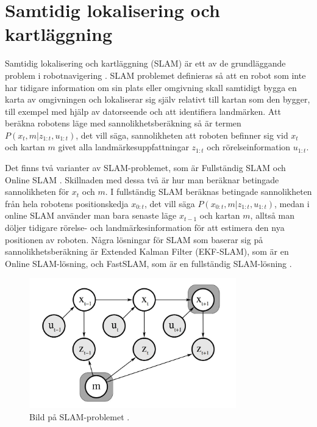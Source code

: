 \chapter{Samtidig lokalisering och kartläggning}

Samtidig lokalisering och kartläggning (SLAM) är ett av de grundläggande problem i robotnavigering \citep{realslamproblem}. SLAM problemet definieras så att en robot som inte har tidigare information om sin plats eller omgivning skall samtidigt bygga en karta av omgivningen och lokaliserar sig själv relativt till kartan som den bygger, till exempel med hjälp av datorseende och att identifiera landmärken. Att beräkna robotens läge med sannolikhetsberäkning så är termen $P(x_t, m|z_{1:t}, u_{1:t})$, det vill säga, sannolikheten att roboten befinner sig vid $x_t$ och kartan $m$ givet alla landmärkesuppfattningar $z_{1:t}$ och rörelseinformation $u_{1:t}$. 

Det finns två varianter av SLAM-problemet, som är Fullständig SLAM och Online SLAM \citep{ProbabilisticRobotics}. Skillnaden med dessa två är hur man beräknar betingade sannolikheten för $x_t$ och $m$. I fullständig SLAM beräknas betingade sannolikheten från hela robotens positionskedja $x_{0:t}$, det vill säga $P(x_{0:t}, m | z_{1:t}, u_{1:t})$, medan i online SLAM använder man bara senaste läge $x_{t-1}$ och kartan $m$, alltså man döljer tidigare rörelse- och landmärkesinformation för att estimera den nya positionen av roboten. Några lösningar för SLAM som baserar sig på sannolikhetsberäkning är Extended Kalman Filter (EKF-SLAM), som är en Online SLAM-lösning, och FastSLAM, som är en fullständig SLAM-lösning \citep{realslamproblem, ProbabilisticRobotics}. 

\begin{figure}[ht]
    \begin{center}
    \includegraphics[width=0.8\textwidth]{online-slam.JPG}
    \caption{Bild på SLAM-problemet \citep{ProbabilisticRobotics}.}
    \label{slam-problemet}
    \end{center}
\end{figure}

